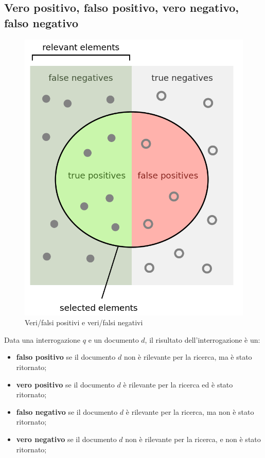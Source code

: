 \subsection{Vero positivo, falso positivo, vero negativo, falso negativo}
\begin{center}
    \begin{figure}
        \includegraphics[scale=0.2]{immagini/truefalsenegativepositive.png}
        \caption{Veri/falsi positivi e veri/falsi negativi}
    \end{figure}
\end{center}
Data una interrogazione $q$ e un documento $d$, il risultato dell'interrogazione è un:
\begin{itemize}
    \item \textbf{falso positivo} se il documento $d$ non è rilevante per la ricerca, ma è stato ritornato;
    \item \textbf{vero positivo} se il documento $d$ è rilevante per la ricerca ed è stato ritornato;
    \item \textbf{falso negativo} se il documento $d$ è rilevante per la ricerca, ma non è stato ritornato;
    \item \textbf{vero negativo} se il documento $d$ non è rilevante per la ricerca, e non è stato ritornato;
\end{itemize}

